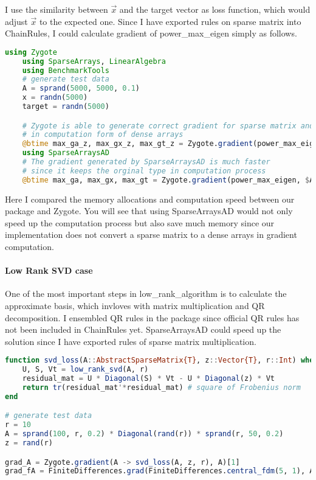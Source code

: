 I use the similarity between $\vec{x}$ and the target vector as loss function, which would adjust $\vec{x}$
to the expected one. Since I have exported rules on sparse matrix into ChainRules, I could 
calculate gradient of power\_max\_eigen simply as follows.  

\begin{lstlisting}[language=Julia]
    using Zygote
    using SparseArrays, LinearAlgebra
    using BenchmarkTools
    # generate test data
    A = sprand(5000, 5000, 0.1)
    x = randn(5000)
    target = randn(5000)

    # Zygote is able to generate correct gradient for sparse matrix and dense vectors
    # in computation form of dense arrays  
    @btime max_ga_z, max_gx_z, max_gt_z = Zygote.gradient(power_max_eigen, $A, $x, $target) #12.954 s (4272 allocations: 27.91 GiB)
    using SparseArraysAD
    # The gradient generated by SparseArraysAD is much faster
    # since it keeps the orginal type in computation process 
    @btime max_ga, max_gx, max_gt = Zygote.gradient(power_max_eigen, $A, $x, $target) # 6.180 s (5072 allocations: 16.75 GiB)
\end{lstlisting}

Here I compared the memory allocations and computation speed between our package and Zygote.
You will see that using SparseArraysAD would not only speed up the computation process 
but also save much memory since our implementation does not convert a sparse matrix 
to a dense arrays in gradient computation.

\paragraph{Low Rank SVD case}
One of the most important steps in low\_rank\_algorithm is to calculate the approximate basis, which 
invloves with matrix multiplication and QR decomposition. I ensembled QR rules in the package since 
official QR rules has not been included in ChainRules yet. SparseArraysAD could speed up the solution 
since I have exported rules of sparse matrix multiplication.

\begin{lstlisting}[language=Julia]
function svd_loss(A::AbstractSparseMatrix{T}, z::Vector{T}, r::Int) where T
    U, S, Vt = low_rank_svd(A, r)
    residual_mat = U * Diagonal(S) * Vt - U * Diagonal(z) * Vt
    return tr(residual_mat'*residual_mat) # square of Frobenius norm
end

# generate test data
r = 10
A = sprand(100, r, 0.2) * Diagonal(rand(r)) * sprand(r, 50, 0.2)
z = rand(r)

grad_A = Zygote.gradient(A -> svd_loss(A, z, r), A)[1] 
grad_fA = FiniteDifferences.grad(FiniteDifferences.central_fdm(5, 1), A -> svd_loss(A, z, r), A)[1]
\end{lstlisting}

